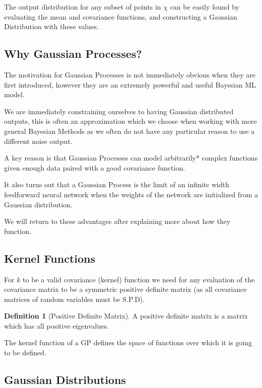 \documentclass[12pt, a4paper]{report}
\theoremstyle{definition}
\theoremstyle{definition}
\newtheorem{definition}{Definition}[section]
\theoremstyle{definition}
\begin{document}
The output distribution for any subset of points in $\chi$ can be easily found by evaluating the mean and covariance functions, and constructing a Gaussian Distribution with these values.


\subsection{Why Gaussian Processes?}

The motivation for Gaussian Processes is not immediately obvious when they are first introduced, however they are an extremely powerful and useful Bayesian ML model.

We are immediately constraining ourselves to having Gaussian distributed outputs, this is often an approximation which we choose when working with more general Bayesian Methods as we often do not have any particular reason to use a different noise output.

A key reason is that Gaussian Processes can model arbitrarily* complex functions given enough data paired with a good covariance function.

It also turns out that a Gaussian Process is the limit of an infinite width feedforward neural network when the weights of the network are initialized from a Gaussian distribution. \cite{GPInfinite}

We will return to these advantages after explaining more about how they function.

\subsection{Kernel Functions}

For $k$ to be a valid covariance (kernel) function we need for any evaluation of the covariance matrix to be a symmetric positive definite matrix (as all covariance matrices of random variables must be S.P.D).

\begin{definition}[Positive Definite Matrix]
    A positive definite matrix is a matrix which has all positive eigenvalues.
\end{definition}

The kernel function of a GP defines the space of functions over which it is going to be defined.

\subsection{Gaussian Distributions}
\end{document}
